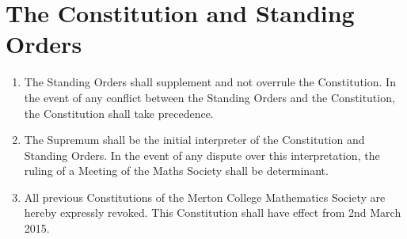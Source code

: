 \documentclass[pdftex,a4paper]{report}
\begin{document}
\section*{The Constitution and Standing Orders}

\begin{enumerate}[resume*]
	\item The Standing Orders shall supplement and not overrule the Constitution. In the event of any conflict between the Standing Orders and the Constitution, the Constitution shall take precedence.
	\item The Supremum shall be the initial interpreter of the Constitution and Standing Orders. In the event of any dispute over this interpretation, the ruling of a Meeting of the Maths Society shall be determinant.
	\item All previous Constitutions of the Merton College Mathematics Society are hereby expressly revoked. This Constitution shall have effect from 2nd March 2015.
\end{enumerate}
\end{document}
